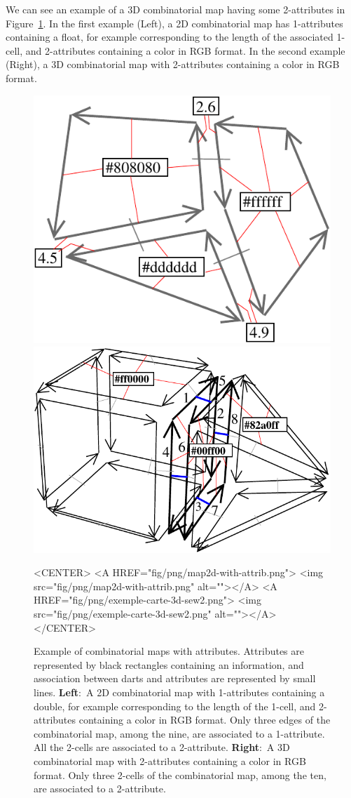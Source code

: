 We can see an example of a 3D combinatorial map having some
2-attributes in Figure~\ref{fig-exemple-attribs}. In the first example
(Left), a 2D combinatorial map has 1-attributes containing a float,
for example corresponding to the length of the associated 1-cell, and
2-attributes containing a color in RGB format.  In the second example
(Right), a 3D combinatorial map with 2-attributes containing a color
in RGB format.
%
\begin{figure}
  \begin{ccTexOnly}
    \begin{center}
      \includegraphics[width=.3\textwidth]{Combinatorial_map/fig/pdf/map2d-with-attrib}\qquad
      \includegraphics[width=.45\textwidth]{Combinatorial_map/fig/pdf/exemple-carte-3d-sew2}
    \end{center}
  \end{ccTexOnly}
  \begin{ccHtmlOnly}
    <CENTER> <A HREF="fig/png/map2d-with-attrib.png"> <img
    src="fig/png/map2d-with-attrib.png" alt=""></A> <A
    HREF="fig/png/exemple-carte-3d-sew2.png"> <img
    src="fig/png/exemple-carte-3d-sew2.png" alt=""></A> </CENTER>
  \end{ccHtmlOnly}
  \caption{Example of combinatorial maps with attributes. Attributes
    are represented by black rectangles containing an information, and
    association between darts and attributes are represented by small
    lines.  \textbf{Left}:~A 2D combinatorial map with 1-attributes
    containing a double, for example corresponding to the length of
    the 1-cell, and 2-attributes containing a color in RGB format.
    Only three edges of the combinatorial map, among the nine, are
    associated to a 1-attribute. All the 2-cells are associated to a
    2-attribute. \textbf{Right}:~A 3D combinatorial map with
    2-attributes containing a color in RGB format. Only three 2-cells
    of the combinatorial map, among the ten, are associated to a
    2-attribute.}
  \label{fig-exemple-attribs}
\end{figure}

